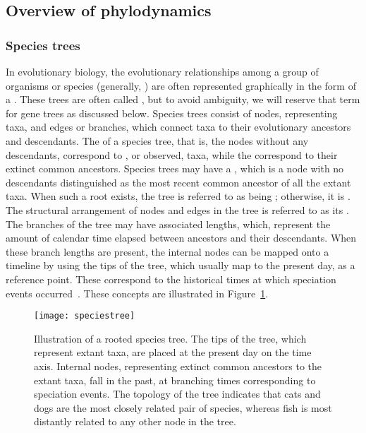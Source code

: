 \subsection{Overview of phylodynamics}

\subsubsection{Species trees}

In evolutionary biology, the evolutionary relationships among a group of
organisms or species (generally, ) are often represented graphically
in the form of a . These trees are often called
, but to avoid ambiguity, we will reserve that term for gene
trees as discussed below. Species trees consist of nodes, representing taxa,
and edges or branches, which connect taxa to their evolutionary ancestors and
descendants. The  of a species tree, that is, the nodes without any
descendants, correspond to , or observed, taxa, while the
 correspond to their extinct common ancestors. Species
trees may have a , which is a node with no descendants distinguished
as the most recent common ancestor of all the extant taxa. When such a root
exists, the tree is referred to as being ; otherwise, it is
. The structural arrangement of nodes and edges in the tree is
referred to as its . The branches of the tree may have
associated lengths, which, represent the amount of calendar time elapsed
between ancestors and their descendants. When these branch lengths are present,
the internal nodes can be mapped onto a timeline by using the tips of the tree,
which usually map to the present day, as a reference point. These
 correspond to the historical times at which speciation
events occurred~\autocite{nee1992tempo}. These concepts are illustrated in
Figure~\ref{fig:speciestree}.

\begin{figure}[h]
  \centering
  \label{fig:speciestree}
  \texttt{[image: speciestree]}
  \caption{Illustration of a rooted species tree. The tips of the tree, which
    represent extant taxa, are placed at the present day on the time axis.
    Internal nodes, representing extinct common ancestors to the extant taxa,
    fall in the past, at branching times corresponding to speciation events.
    The topology of the tree indicates that cats and dogs are the most closely
    related pair of species, whereas fish is most distantly related to any
    other node in the tree.}
\end{figure}


